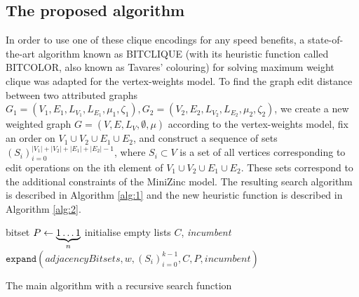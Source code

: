 \documentclass{article}
\theoremstyle{definition}
\begin{document}
\subsection{The proposed algorithm}
\label{sec:alg}
In order to use one of these clique encodings for any speed benefits, a state-of-the-art algorithm known as BITCLIQUE \cite{tavares_2016} (with its heuristic function called BITCOLOR, also known as Tavares' colouring) for solving maximum weight clique was adapted for the vertex-weights model. To find the graph edit distance between two attributed graphs $G_1 = (V_1, E_1, L_{V_1}, L_{E_1}, \mu_1, \zeta_1), G_2 = (V_2, E_2, L_{V_2}, L_{E_2}, \mu_2, \zeta_2)$, we create a new weighted graph $G = (V, E, L_V, \emptyset, \mu)$ according to the vertex-weights model, fix an order on $V_1 \cup V_2 \cup E_1 \cup E_2$, and construct a sequence of sets $(S_i)_{i=0}^{|V_1|+|V_2|+|E_1|+|E_2|-1}$, where $S_i \subset V$ is a set of all vertices corresponding to edit operations on the ith element of $V_1 \cup V_2 \cup E_1 \cup E_2$. These sets correspond to the additional constraints of the MiniZinc model. The resulting search algorithm is described in Algorithm \ref{alg:1} and the new heuristic function is described in Algorithm \ref{alg:2}.
\begin{algorithm}
  bitset $P \gets \underbrace{1\dots1}_{\mathclap{n}}$\;
  initialise empty lists $C$, \textit{incumbent}\;
  $\mathtt{expand}(\mathit{adjacencyBitsets}, w, (S_i)_{i=0}^{k-1}, C, P, \mathit{incumbent})$\;
  \;
  \caption{The main algorithm with a recursive search function}
  \label{alg:1}
\end{algorithm}
\end{document}
